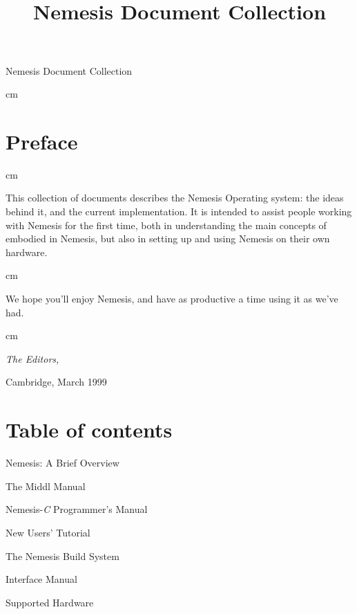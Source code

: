 \documentclass[a4paper,12pt]{article}
\begin{document}
\title{%
   \\[1.5in]
  \Huge Nemesis Document Collection
}

\maketitle
\thispagestyle{empty}

\eject

\begin{center}

{\LARGE
Nemesis Document Collection
}

\end{center}

\parindent=0pt

 cm

\section*{Preface}

 cm

This collection of documents describes the Nemesis Operating system:
the ideas behind it, and the current implementation.  It is intended
to assist people working with Nemesis for the first time, both in
understanding the main concepts of embodied in Nemesis, but also in
setting up and using Nemesis on their own hardware.

 cm

We hope you'll enjoy Nemesis, and have as productive a time using it
as we've had.

 cm

{\it 
The Editors,

Cambridge, March 1999
}

\eject

\section*{Table of contents}

\def\paper#1#2{\vskip 1mm #1 \dotfill #2\par}

\paper{Nemesis: A Brief Overview}{1}

\paper{The Middl Manual}{2}

\paper{Nemesis-\textsl{C} Programmer's Manual}{3}

\paper{New Users' Tutorial}{4}

\paper{The Nemesis Build System}{5}

\paper{Interface Manual}{6}

\paper{Supported Hardware}{7}


\cleardoublepage

\ 
\end{document}
